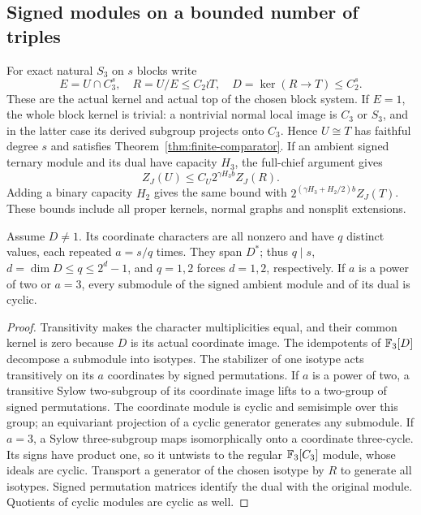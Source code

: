 \subsection{Signed modules on a bounded number of triples}
For exact natural $S_3$ on $s$ blocks write
\[
 E=U\cap C_3^s,\quad R=U/E\leq C_2\wr T,\quad
 D=\ker(R\longrightarrow T)\leq C_2^s.
\]
These are the actual kernel and actual top of the chosen block
system. If $E=1$, the whole block kernel is trivial: a nontrivial
normal local image is $C_3$ or $S_3$, and in the latter case its
derived subgroup projects onto $C_3$. Hence $U\cong T$ has faithful
degree $s$ and satisfies Theorem~\ref{thm:finite-comparator}.
If an ambient signed ternary module and its dual have capacity $H_3$,
the full-chief argument gives
\begin{equation}\label{eq:bounded-s3-layer}
 Z_J(U)\leq C_U2^{\gamma H_3b}Z_J(R).
\end{equation}
Adding a binary capacity $H_2$ gives the same bound with
$2^{(\gamma H_3+H_2/2)b}Z_J(T)$. These bounds include all proper
kernels, normal graphs and nonsplit extensions.

\begin{lemma}\label{lem:signed-isotypes}
Assume $D\ne1$. Its coordinate characters are all nonzero and have
$q$ distinct values, each repeated $a=s/q$ times. They span $D^*$;
thus $q\mid s$, $d=\dim D\leq q\leq2^d-1$, and $q=1,2$ forces
$d=1,2$, respectively. If $a$ is a power of two or $a=3$, every
submodule of the signed ambient module and of its dual is cyclic.
\end{lemma}
\begin{proof}
Transitivity makes the character multiplicities equal, and their
common kernel is zero because $D$ is its actual coordinate image.
The idempotents of $\mathbb F_3[D]$ decompose a submodule into isotypes.
The stabilizer of one isotype acts transitively on its $a$ coordinates
by signed permutations. If $a$ is a power of two, a transitive Sylow
two-subgroup of its coordinate image lifts to a two-group of signed
permutations. The coordinate module is cyclic and semisimple over
this group; an equivariant projection of a cyclic generator generates
any submodule. If $a=3$, a Sylow three-subgroup maps isomorphically
onto a coordinate three-cycle. Its signs have product one, so it
untwists to the regular $\mathbb F_3[C_3]$ module, whose ideals are cyclic.
Transport a generator of the chosen isotype by $R$ to generate all
isotypes. Signed permutation matrices identify the dual with the
original module. Quotients of cyclic modules are cyclic as well.
\end{proof}


